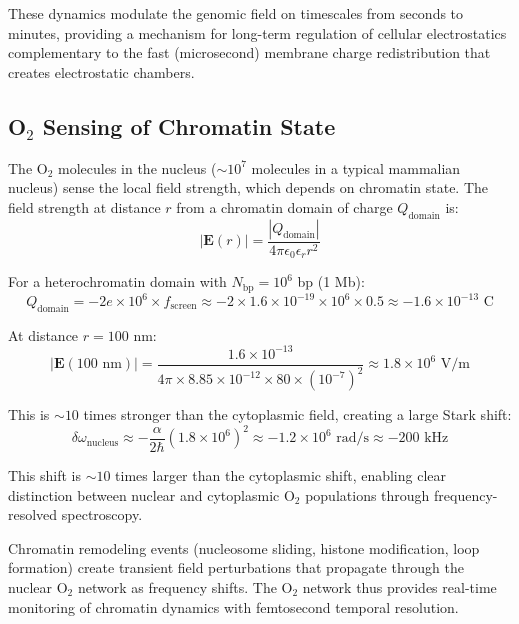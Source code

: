 \documentclass[twocolumn,10pt,aps,prd,superscriptaddress,floatfix,nofootinbib]{revtex4-2}
\theoremstyle{remark}
\begin{document}
These dynamics modulate the genomic field on timescales from seconds to minutes, providing a mechanism for long-term regulation of cellular electrostatics complementary to the fast (microsecond) membrane charge redistribution that creates electrostatic chambers.

\subsection{O$_2$ Sensing of Chromatin State}

The O$_2$ molecules in the nucleus ($\sim 10^7$ molecules in a typical mammalian nucleus) sense the local field strength, which depends on chromatin state. The field strength at distance $r$ from a chromatin domain of charge $Q_{\mathrm{domain}}$ is:
\begin{equation}
|\mathbf{E}(r)| = \frac{|Q_{\mathrm{domain}}|}{4\pi\epsilon_0\epsilon_r r^2}
\end{equation}

For a heterochromatin domain with $N_{\mathrm{bp}} = 10^6$ bp (1 Mb):
\begin{equation}
Q_{\mathrm{domain}} = -2e \times 10^6 \times f_{\mathrm{screen}} \approx -2 \times 1.6 \times 10^{-19} \times 10^6 \times 0.5 \approx -1.6 \times 10^{-13} \text{ C}
\end{equation}

At distance $r = 100$ nm:
\begin{equation}
|\mathbf{E}(100 \text{ nm})| = \frac{1.6 \times 10^{-13}}{4\pi \times 8.85 \times 10^{-12} \times 80 \times (10^{-7})^2} \approx 1.8 \times 10^{6} \text{ V/m}
\end{equation}

This is $\sim 10$ times stronger than the cytoplasmic field, creating a large Stark shift:
\begin{equation}
\delta\omega_{\mathrm{nucleus}} \approx -\frac{\alpha}{2\hbar} (1.8 \times 10^{6})^2 \approx -1.2 \times 10^{6} \text{ rad/s} \approx -200 \text{ kHz}
\end{equation}

This shift is $\sim 10$ times larger than the cytoplasmic shift, enabling clear distinction between nuclear and cytoplasmic O$_2$ populations through frequency-resolved spectroscopy.

Chromatin remodeling events (nucleosome sliding, histone modification, loop formation) create transient field perturbations that propagate through the nuclear O$_2$ network as frequency shifts. The O$_2$ network thus provides real-time monitoring of chromatin dynamics with femtosecond temporal resolution.
\end{document}
